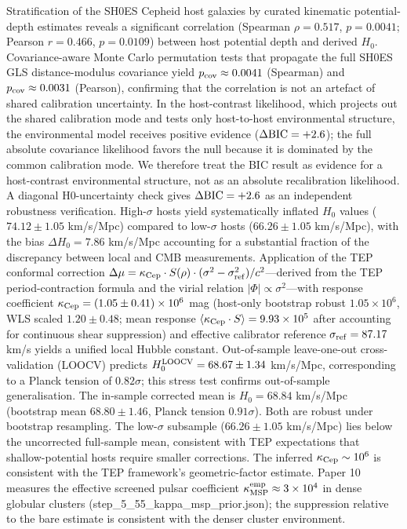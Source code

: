 \documentclass[
]{article}
\begin{document}
Stratification of the SH0ES Cepheid host galaxies by curated kinematic
potential-depth estimates reveals a significant correlation (Spearman
\(\rho =
0.517\), \(p = 0.0041\); Pearson \(r=0.466\), \(p=0.0109\)) between host
potential depth and derived \(H_0\). Covariance-aware Monte Carlo
permutation tests that propagate the full SH0ES GLS distance-modulus
covariance yield \(p_{\rm cov}\approx0.0041\) (Spearman) and
\(p_{\rm cov}\approx0.0031\) (Pearson), confirming that the correlation
is not an artefact of shared calibration uncertainty. In the
host-contrast likelihood, which projects out the shared calibration mode
and tests only host-to-host environmental structure, the environmental
model receives positive evidence (\(\Delta{\rm BIC} = +2.6\)); the full
absolute covariance likelihood favors the null because it is dominated
by the common calibration mode. We therefore treat the BIC result as
evidence for a host-contrast environmental structure, not as an absolute
recalibration likelihood. A diagonal H\(0\)-uncertainty check gives
\(\Delta{\rm BIC}=+2.6\) as an independent robustness verification.
High-\(\sigma\) hosts yield systematically inflated \(H_0\) values
(\(74.12 \pm
1.05\) km/s/Mpc) compared to low-\(\sigma\) hosts (\(66.26 \pm 1.05\)
km/s/Mpc), with the bias \(\Delta H_0 = 7.86\) km/s/Mpc accounting for a
substantial fraction of the discrepancy between local and CMB
measurements. Application of the TEP conformal correction
\(\Delta\mu = \kappa_{\rm Cep}\cdot S(\rho)\cdot
(\sigma^2-\sigma_{\rm ref}^2)/c^2\)---derived from the TEP
period-contraction formula and the virial relation
\(|\Phi|\propto\sigma^2\)---with response coefficient
\(\kappa_{\rm Cep} = (1.05 \pm 0.41)\times10^6\) mag (host-only
bootstrap robust \(1.05\times10^6\), WLS scaled \(1.20 \pm 0.48\); mean
response \(\langle \kappa_{\rm Cep} \cdot S \rangle = 9.93\times10^5\)
after accounting for continuous shear suppression) and effective
calibrator reference \(\sigma_{\rm ref} = 87.17\) km/s yields a unified
local Hubble constant. Out-of-sample leave-one-out cross-validation
(LOOCV) predicts \(H_0^{\rm LOOCV} = 68.67 \pm 1.34\) km/s/Mpc,
corresponding to a Planck tension of \(0.82\sigma\); this stress test
confirms out-of-sample generalisation. The in-sample corrected mean is
\(H_0 = 68.84\) km/s/Mpc (bootstrap mean \(68.80 \pm 1.46\), Planck
tension \(0.91\sigma\)). Both are robust under bootstrap resampling. The
low-\(\sigma\) subsample (\(66.26 \pm 1.05\) km/s/Mpc) lies below the
uncorrected full-sample mean, consistent with TEP expectations that
shallow-potential hosts require smaller corrections. The inferred
\(\kappa_{\rm Cep}\sim10^6\) is consistent with the TEP framework's
geometric-factor estimate. Paper 10 measures the effective screened
pulsar coefficient \(\kappa_{\rm MSP}^{\rm emp} \approx 3\times10^4\) in
dense globular clusters (step\_5\_55\_kappa\_msp\_prior.json); the
suppression relative to the bare estimate is consistent with the denser
cluster environment.
\end{document}
